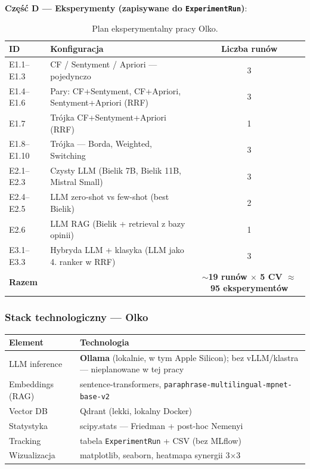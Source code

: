 \documentclass[a4paper,11pt]{article}
\newcommand{\code}[1]{\texttt{\small #1}}
\begin{document}
\textbf{Część D --- Eksperymenty (zapisywane do \code{ExperimentRun})}:

\begin{table}[H]
\centering
\small
\begin{tabularx}{\textwidth}{l Y c}
\toprule
\textbf{ID} & \textbf{Konfiguracja} & \textbf{Liczba runów} \\
\midrule
E1.1--E1.3 & CF / Sentyment / Apriori --- pojedynczo & 3 \\
E1.4--E1.6 & Pary: CF+Sentyment, CF+Apriori, Sentyment+Apriori (RRF) & 3 \\
E1.7 & Trójka CF+Sentyment+Apriori (RRF) & 1 \\
E1.8--E1.10 & Trójka --- Borda, Weighted, Switching & 3 \\
E2.1--E2.3 & Czysty LLM (Bielik 7B, Bielik 11B, Mistral Small) & 3 \\
E2.4--E2.5 & LLM zero-shot vs few-shot (best Bielik) & 2 \\
E2.6 & LLM RAG (Bielik + retrieval z bazy opinii) & 1 \\
E3.1--E3.3 & Hybryda LLM + klasyka (LLM jako 4. ranker w RRF) & 3 \\
\midrule
\textbf{Razem} & & \textbf{$\sim$19 runów $\times$ 5 CV $\approx$ 95 eksperymentów} \\
\bottomrule
\end{tabularx}
\caption{Plan eksperymentalny pracy Olko.}
\end{table}

\subsubsection*{Stack technologiczny --- Olko}

\begin{table}[H]
\centering
\small
\begin{tabularx}{\textwidth}{l Y}
\toprule
\textbf{Element} & \textbf{Technologia} \\
\midrule
LLM inference & \textbf{Ollama} (lokalnie, w tym Apple Silicon); bez vLLM/klastra --- nieplanowane w tej pracy \\
Embeddings (RAG) & sentence-transformers, \code{paraphrase-multilingual-mpnet-base-v2} \\
Vector DB & Qdrant (lekki, lokalny Docker) \\
Statystyka & scipy.stats --- Friedman + post-hoc Nemenyi \\
Tracking & tabela \code{ExperimentRun} + CSV (bez MLflow) \\
Wizualizacja & matplotlib, seaborn, heatmapa synergii 3$\times$3 \\
\bottomrule
\end{tabularx}
\end{table}
\end{document}
